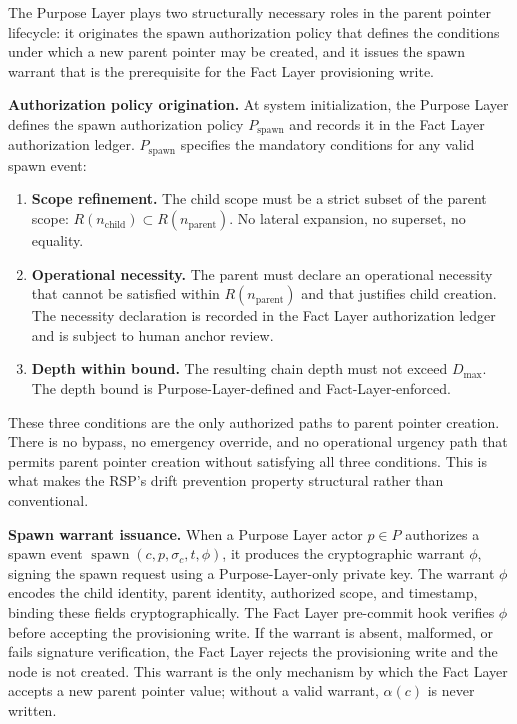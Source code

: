 The Purpose Layer plays two structurally necessary roles in the parent pointer lifecycle: it originates the spawn authorization policy that defines the conditions under which a new parent pointer may be created, and it issues the spawn warrant that is the prerequisite for the Fact Layer provisioning write.

\medskip
\noindent\textbf{Authorization policy origination.} At system initialization, the Purpose Layer defines the spawn authorization policy $P_{\mathrm{spawn}}$ and records it in the Fact Layer authorization ledger. $P_{\mathrm{spawn}}$ specifies the mandatory conditions for any valid spawn event:

\begin{enumerate}
\item[(S1)] \textbf{Scope refinement.} The child scope must be a strict subset of the parent scope: $R(n_{\mathrm{child}}) \subset R(n_{\mathrm{parent}})$. No lateral expansion, no superset, no equality.

\item[(S2)] \textbf{Operational necessity.} The parent must declare an operational necessity that cannot be satisfied within $R(n_{\mathrm{parent}})$ and that justifies child creation. The necessity declaration is recorded in the Fact Layer authorization ledger and is subject to human anchor review.

\item[(S3)] \textbf{Depth within bound.} The resulting chain depth must not exceed $D_{\max}$. The depth bound is Purpose-Layer-defined and Fact-Layer-enforced.
\end{enumerate}

These three conditions are the only authorized paths to parent pointer creation. There is no bypass, no emergency override, and no operational urgency path that permits parent pointer creation without satisfying all three conditions. This is what makes the RSP's drift prevention property structural rather than conventional.

\medskip
\noindent\textbf{Spawn warrant issuance.} When a Purpose Layer actor $p \in P$ authorizes a spawn event $\operatorname{spawn}(c, p, \sigma_c, t, \phi)$, it produces the cryptographic warrant $\phi$, signing the spawn request using a Purpose-Layer-only private key. The warrant $\phi$ encodes the child identity, parent identity, authorized scope, and timestamp, binding these fields cryptographically. The Fact Layer pre-commit hook verifies $\phi$ before accepting the provisioning write. If the warrant is absent, malformed, or fails signature verification, the Fact Layer rejects the provisioning write and the node is not created. This warrant is the only mechanism by which the Fact Layer accepts a new parent pointer value; without a valid warrant, $\alpha(c)$ is never written.

